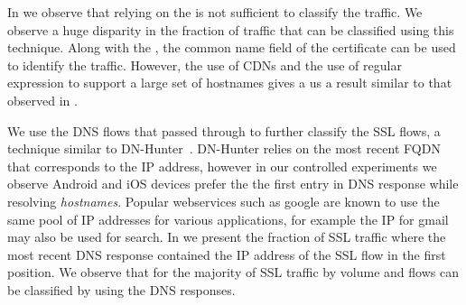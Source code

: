 In  we observe that relying on the \sslservername is not sufficient to classify the traffic. 
We observe a huge disparity in the fraction of traffic that can be classified using this technique.
Along with the \sslservername, the common name field of the certificate can be used to identify the traffic. 
However, the use of CDNs and the use of regular expression to support a large set of hostnames gives a us a result similar to that observed in .



We use the DNS flows that passed through \platname to further classify the SSL flows, a technique similar to DN-Hunter~\cite{bermudez:dnhunter}.
DN-Hunter relies on the most recent FQDN that corresponds to the IP address, however in our controlled experiments we observe Android and iOS devices prefer the the first entry in DNS response while resolving \emph{hostnames}.
Popular webservices such as google are known to use the same pool of IP addresses for various applications, for example the IP for gmail may also be used for search. 
In  we present the fraction of SSL traffic where the most recent DNS response contained the IP address of the SSL flow in the first position. 
We observe that for the majority of SSL traffic by volume and flows can be classified by using the DNS responses. 

